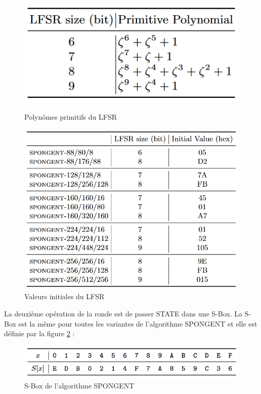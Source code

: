		\begin{figure}[!htb]
			\begin{minipage}{0.48\textwidth}
			  \centering
			  \includegraphics[width=\textwidth]{imgs/Spongent/PrimiPolySpongent.png}
			  \caption{Polynômes primitifs du LFSR}
			  \label{polyPrimitifsLFSR}
			\end{minipage}
			\hfill
			\begin {minipage}{0.48\textwidth}
			  \centering
			  \includegraphics[width=\textwidth]{imgs/Spongent/valInitLFSR.png}
			  \caption{Valeurs initiales du LFSR}
			  \label{valInitLFSR}
			\end{minipage}
		 \end{figure}
		La deuxième opération de la ronde est de passer STATE dans une S-Box.
		La S-Box est la même pour toutes les variantes de l’algorithme SPONGENT et elle est définie par la figure \ref{sBoxSpongent.png} :
		
		\begin{figure}[h]
			\centering
			\includegraphics[width=\textwidth]{imgs/Spongent/sBoxSpongent.png}
			\caption{S-Box de l'algorithme SPONGENT}
			\label{sBoxSpongent.png}
		\end{figure}
		   
